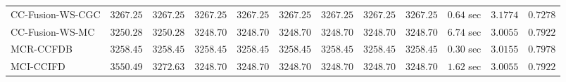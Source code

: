 \begin{table}[H]
\begin{tabular}{lrrrrrrrrrrr}
    CC-Fusion-WS-CGC & $      3267.25$ & $      3267.25$ & $      3267.25$ & $      3267.25$ & $      3267.25$ & $      3267.25$ & $      3267.25$ & $      3267.25$ & $         0.64$ sec    & $       3.1774$  & $       0.7278$ \\ 
     CC-Fusion-WS-MC & $      3250.28$ & $      3250.28$ & $      3248.70$ & $      3248.70$ & $      3248.70$ & $      3248.70$ & $      3248.70$ & $      3248.70$ & $         6.74$ sec    & $       3.0055$  & $       0.7922$ \\ 
\cmidrule{1-1} 
           MCR-CCFDB & $      3258.45$ & $      3258.45$ & $      3258.45$ & $      3258.45$ & $      3258.45$ & $      3258.45$ & $      3258.45$ & $      3258.45$ & $         0.30$ sec    & $       3.0155$  & $       0.7978$ \\ 
\cmidrule{1-1} 
           MCI-CCIFD & $      3550.49$ & $      3272.63$ & $      3248.70$ & $      3248.70$ & $      3248.70$ & $      3248.70$ & $      3248.70$ & $      3248.70$ & $         1.62$ sec    & $       3.0055$  & $       0.7922$ \\ 
\bottomrule
\end{tabular}
\end{table}


